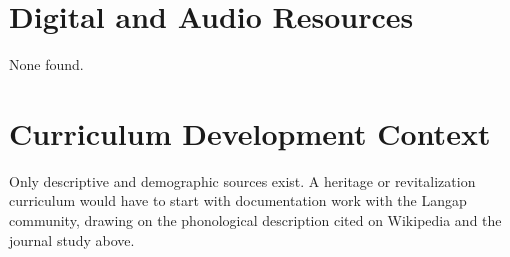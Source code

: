 \documentclass[12pt]{article}
\begin{document}
\section{Digital and Audio Resources}
None found.

\section{Curriculum Development Context}
Only descriptive and demographic sources exist. A heritage or revitalization curriculum would have to start with documentation work with the Langap community, drawing on the phonological description cited on Wikipedia and the journal study above.
\end{document}
